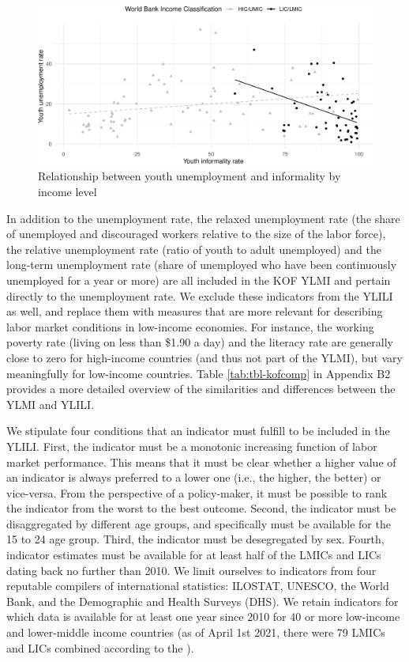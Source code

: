 \documentclass[
  a4paper, twoside, 12pt]{book}
\begin{document}
\begin{figure}[H]
\includegraphics{figures/fig-infunemp-1} \caption{Relationship between youth unemployment and informality by income level}\label{fig:fig-infunemp}
\end{figure}

In addition to the unemployment rate, the relaxed unemployment rate (the share of unemployed and discouraged workers relative to the size of the labor force), the relative unemployment rate (ratio of youth to adult unemployed) and the long-term unemployment rate (share of unemployed who have been continuously unemployed for a year or more) are all included in the KOF YLMI and pertain directly to the unemployment rate. We exclude these indicators from the YLILI as well, and replace them with measures that are more relevant for describing labor market conditions in low-income economies. For instance, the working poverty rate (living on less than \$1.90 a day) and the literacy rate are generally close to zero for high-income countries (and thus not part of the YLMI), but vary meaningfully for low-income countries. Table \ref{tab:tbl-kofcomp} in Appendix B2 provides a more detailed overview of the similarities and differences between the YLMI and YLILI.

We stipulate four conditions that an indicator must fulfill to be included in the YLILI. First, the indicator must be a monotonic increasing function of labor market performance. This means that it must be clear whether a higher value of an indicator is always preferred to a lower one (i.e., the higher, the better) or vice-versa. From the perspective of a policy-maker, it must be possible to rank the indicator from the worst to the best outcome. Second, the indicator must be disaggregated by different age groups, and specifically must be available for the 15 to 24 age group. Third, the indicator must be desegregated by sex. Fourth, indicator estimates must be available for at least half of the LMICs and LICs dating back no further than 2010. We limit ourselves to indicators from four reputable compilers of international statistics: ILOSTAT, UNESCO, the World Bank, and the Demographic and Health Surveys (DHS). We retain indicators for which data is available for at least one year since 2010 for 40 or more low-income and lower-middle income countries (as of April 1st 2021, there were 79 LMICs and LICs combined according to the \textcite{worldbank2020a}).
\end{document}
